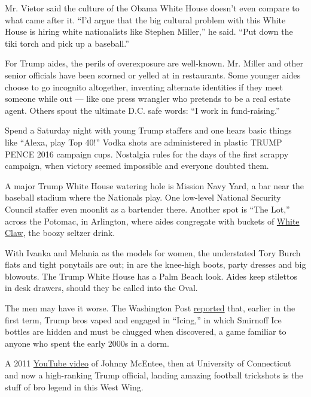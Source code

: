 Mr. Vietor said the culture of the Obama White House doesn't even
compare to what came after it. ``I'd argue that the big cultural problem
with this White House is hiring white nationalists like Stephen
Miller,'' he said. ``Put down the tiki torch and pick up a baseball.''

For Trump aides, the perils of overexposure are well-known. Mr. Miller
and other senior officials have been scorned or yelled at in
restaurants. Some younger aides choose to go incognito altogether,
inventing alternate identities if they meet someone while out --- like
one press wrangler who pretends to be a real estate agent. Others spout
the ultimate D.C. safe words: ``I work in fund-raising.''

Spend a Saturday night with young Trump staffers and one hears basic
things like ``Alexa, play Top 40!'' Vodka shots are administered in
plastic TRUMP PENCE 2016 campaign cups. Nostalgia rules for the days of
the first scrappy campaign, when victory seemed impossible and everyone
doubted them.

A major Trump White House watering hole is Mission Navy Yard, a bar near
the baseball stadium where the Nationals play. One low-level National
Security Council staffer even moonlit as a bartender there. Another spot
is ``The Lot,'' across the Potomac, in Arlington, where aides congregate
with buckets of
\href{https://www.nytimes.com/2019/09/05/style/white-claw-popular-memes.html}{White
Claw}, the boozy seltzer drink.

With Ivanka and Melania as the models for women, the understated Tory
Burch flats and tight ponytails are out; in are the knee-high boots,
party dresses and big blowouts. The Trump White House has a Palm Beach
look. Aides keep stilettos in desk drawers, should they be called into
the Oval.

The men may have it worse. The Washington Post
\href{https://www.washingtonpost.com/investigations/behind-the-chaos-office-that-vets-trump-appointees-plagued-by-inexperience/2018/03/30/cde31a1a-28a3-11e8-ab19-06a445a08c94_story.html}{reported}
that, earlier in the first term, Trump bros vaped and engaged in
``Icing,'' in which Smirnoff Ice bottles are hidden and must be chugged
when discovered, a game familiar to anyone who spent the early 2000s in
a dorm.

A 2011 \href{https://www.youtube.com/watch?v=9Ggia03nT40}{YouTube video}
of Johnny McEntee, then at University of Connecticut and now a
high-ranking Trump official, landing amazing football trickshots is the
stuff of bro legend in this West Wing.

